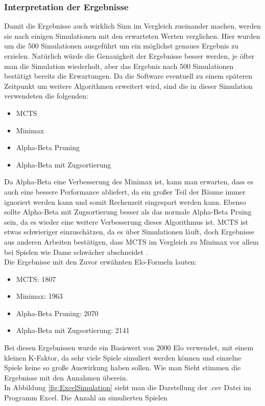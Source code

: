 \documentclass[12pt,a4paper,bibliography=totocnumbered,listof=totocnumbered]{article}
\begin{document}
\subsubsection{Interpretation der Ergebnisse}
Damit die Ergebnisse auch wirklich Sinn im Vergleich zueinander machen, werden sie nach einigen Simulationen mit den erwarteten Werten verglichen.
Hier wurden um die 500 Simulationen ausgeführt um ein möglichst genaues Ergebnis zu erzielen. Natürlich würde die Genauigkeit der Ergebnisse 
besser werden, je öfter man die Simulation wiederholt, aber das Ergebnis nach 500 Simulationen bestätigt bereits die Erwartungen.
Da die Software eventuell zu einem späteren Zeitpunkt um weitere Algorithmen erweitert wird, sind die in dieser Simulation verwendeten die folgenden:
\begin{itemize}
    \item MCTS
    \item Minimax 
    \item Alpha-Beta Pruning
    \item Alpha-Beta mit Zugsortierung 
\end{itemize}
Da Alpha-Beta eine Verbesserung des Minimax ist, kann man erwarten, dass es auch eine bessere Performance abliefert, da ein großer Teil der Bäume 
immer ignoriert werden kann und somit Rechenzeit eingespart werden kann. Ebenso sollte Alpha-Beta mit Zugsortierung besser als das normale 
Alpha-Beta Pruing sein, da es wieder eine weitere Verbesserung dieses Algorithmus ist. MCTS ist etwas schwieriger einzuschätzen, da 
es über Simulationen läuft, doch Ergebnisse aus anderen Arbeiten bestätigen, dass MCTS im Vergleich zu Minimax vor allem bei Spielen wie Dame 
schwächer abschneidet \cite{MiniaxMCTScomparison}.
\\
Die Ergebnisse mit den Zuvor erwähnten Elo-Formeln lauten:
\begin{itemize}
    \item MCTS: 1807
    \item Minimax: 1963
    \item Alpha-Beta Pruning: 2070
    \item Alpha-Beta mit Zugsortierung: 2141
\end{itemize}
Bei diesen Ergebnissen wurde ein Basiswert von 2000 Elo verwendet, mit einem kleinen K-Faktor, da sehr viele Spiele simuliert werden können und 
einzelne Spiele keine so große Auswirkung haben sollen. Wie man Sieht stimmen die Ergebnisse mit den Annahmen überein.
\\
In Abbildung \ref{fig:ExcelSimulation} sieht man die Darstellung der .csv Datei im Programm Excel. Die Anzahl an simulierten Spielen
\end{document}
